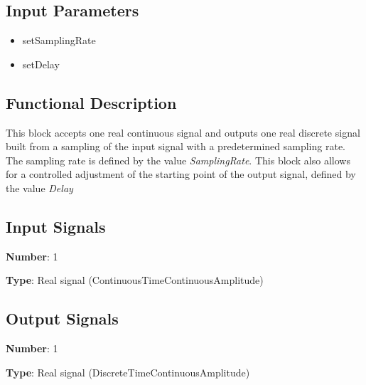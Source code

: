 \documentclass[../../sdf/tex/BPSK_system.tex]{subfiles}
\date{ }
\begin{document}
\onlyinsubfile{\maketitle}

\subsection*{Input Parameters}

\begin{multicols}{2}
	\begin{itemize}
		\item setSamplingRate
		\item setDelay
	\end{itemize}
\end{multicols}

\subsection*{Functional Description}

This block accepts one real continuous signal and outputs one real discrete signal built from a sampling of the input signal with a predetermined sampling rate. The sampling rate is defined by the value \textit{SamplingRate}. This block also allows for a controlled adjustment of the starting point of the output signal, defined by the value \textit{Delay}

\subsection*{Input Signals}

\textbf{Number}: 1

\textbf{Type}: Real signal (ContinuousTimeContinuousAmplitude)

\subsection*{Output Signals}

\textbf{Number}: 1

\textbf{Type}: Real signal (DiscreteTimeContinuousAmplitude)
\end{document}
